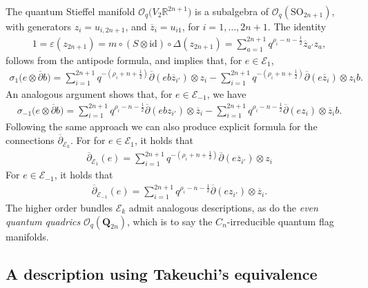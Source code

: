 \documentclass[10pt,a4paper]{amsart}
\numberwithin{equation}{section}
\newcommand{\e}{\varepsilon}
\newcommand\adel{\overline{\partial}}
\begin{document}
The quantum Stieffel manifold $\mathcal{O}_q\big(V_2\mathbb{R}^{2n+1}\big)$ is a subalgebra of $\mathcal{O}_q(\mathrm{SO}_{2n+1})$, with generators $z_i = u_{i,2n+1}$, and $\overline{z}_i = u_{i1}$, for $i = 1, \dots, 2n+1$. The identity
\begin{gather*}
1 = \e(z_{2n+1}) = m \circ (S \otimes \mathrm{id}) \circ \Delta(z_{2n+1}) = \sum_{a=1}^{2n+1} q^{\rho_i - n - \frac{1}{2}}\overline{z}_{a'}z_a,
\end{gather*}
follows from the antipode formula, and implies that, for $e \in \mathcal{E}_1$,
\begin{gather*}
\sigma_1\big(e \otimes \adel b\big) = \sum_{i=1}^{2n+1} q^{-(\rho_i + n + \frac{1}{2})} \adel(eb\overline{z}_{i'}) \otimes z_i - \sum_{i=1}^{2n+1} q^{-(\rho_i + n + \frac{1}{2})} \adel(e\overline{z}_{i}) \otimes z_ib.
\end{gather*}
An analogous argument shows that, for $e \in \mathcal{E}_{-1}$, we have
\begin{gather*}
\sigma_{-1}\big(e \otimes \adel b\big) = \sum_{i=1}^{2n+1} q^{\rho_i - n - \frac{1}{2}}\adel(ebz_{i'}) \otimes \overline{z}_i - \sum_{i=1}^{2n+1} q^{\rho_i - n - \frac{1}{2}} \adel(ez_{i}) \otimes \overline{z}_ib.
\end{gather*}
Following the same approach we can also produce explicit formula for the connections $\adel_{\mathcal{E}_k}$. For for $e \in \mathcal{E}_1$, it holds that
\begin{gather*}
\adel_{\mathcal{E}_1}(e) = \sum_{i=1}^{2n+1} q^{-(\rho_i + n + \frac{1}{2})} \adel(e\overline{z}_{i'}) \otimes z_i
\end{gather*}
For $e \in \mathcal{E}_{-1}$, it holds that
\begin{gather*}
\adel_{\mathcal{E}_{-1}}(e) = \sum_{i=1}^{2n+1} q^{\rho_i - n - \frac{1}{2}}\adel(ez_{i'}) \otimes \overline{z}_i.
\end{gather*}
The higher order bundles $\mathcal{E}_k$ admit analogous descriptions, as do the \emph{even quantum quadrics} $\mathcal{O}_q(\mathbf{Q}_{2n})$, which is to say the $C_{n}$-irreducible quantum flag manifolds.

\subsection{A description using Takeuchi's equivalence} \label{subsection:Takeuchi}
\end{document}
